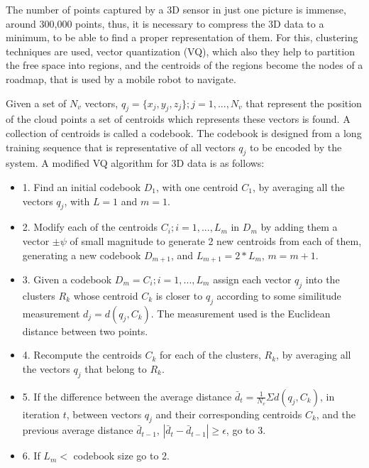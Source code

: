 \documentclass{llncs}
\begin{document}
The number of points captured by a 3D sensor in just one picture is immense, around 300,000 points, thus, it is necessary to 
compress the 3D data to a minimum, to be able to find a proper representation of them. For this, clustering techniques are used,
vector quantization (VQ), which also they help to partition the free space into regions, and the centroids of the regions become
the nodes of a roadmap, that is used by a mobile robot to navigate.


 Given a set of \(N_v\) vectors, \(q_j=\{x_j,y_j,z_j\}; j=1,...,N_v\) that represent the position of the cloud points a set of
centroids which represents these vectors is found.
A collection of centroids is called a codebook.  The codebook is designed from a long training sequence that is representative of all
vectors \(q_j\) to be encoded by the system.
A modified VQ algorithm for 3D \cite{Marco} data is as follows:

\vspace{0.1 in}

 \begin{itemize}[nolistsep,noitemsep]
\item 1. Find an initial codebook \(D_1\), with one centroid \(C_1\), by averaging all the vectors \(q_j\), with \(L=1\) and \(m=1\).

\item 2. Modify each of the centroids \(C_i;i=1,...,L_m\) in \(D_m\) by adding them a vector \(\pm\psi\)
of small magnitude to generate 2 new centroids from each of them, generating a new codebook  \(D_{m+1} \), and
\( L_{m+1} = 2*L_m \), \(m=m+1\).

\item 3. Given a codebook \(D_m={C_i;i=1,...,L_m}\) assign each vector \(q_j\) into the
clusters \(R_k\) whose centroid \(C_k\) is closer to \(q_j\) according to some
similitude measurement \(d_j = d(q_j,C_k)\). The measurement used is the Euclidean distance between two points.

\item 4. Recompute the centroids \(C_k\) for each of the clusters, \(R_k\), by averaging all the vectors
\(q_j\) that belong to \(R_k\).

\item 5. If the difference between the average distance \(\bar d_t = \frac {1} {N_v} \Sigma d(q_j,C_k)\), in iteration \(t\), between vectors \(q_j\)
and their corresponding centroids \(C_k\), and the previous average distance \(\bar d_{t-1} \), \(| \bar d_t - \bar d_{t-1} | \ge \epsilon\),
go to 3.

\item 6. If \(L_m <\)  codebook size go to 2.
\end{itemize}
\end{document}
